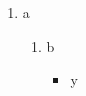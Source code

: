 \documentclass[11pt]{article}
\author{root}
\date{\today}
\title{}
\begin{document}
\tableofcontents

\begin{enumerate}
\item a
\begin{enumerate}
\item b
\begin{itemize}
\setcounter{enumii}{2}
\item y
\end{itemize}
\end{enumerate}
\end{enumerate}
\end{document}
